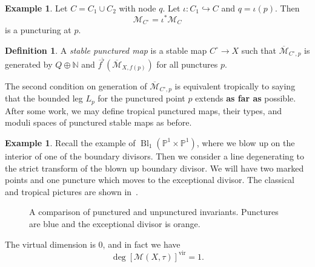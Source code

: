 \documentclass[leqno, openany]{memoir}
\theoremstyle{definition}
\newtheorem{defn}[thm]{Definition}
\newtheorem{exm}[thm]{Example}
\theoremstyle{remark}
\theoremstyle{plain}
\theoremstyle{definition}
\theoremstyle{remark}
\newcommand{\N}{\mathbb{N}}
\renewcommand{\P}{\mathbb{P}}
\newcommand{\mc}[1]{\mathcal{#1}}
\newcommand{\mr}[1]{\mathrm{#1}}
\newcommand{\ol}[1]{\overline{#1}}
\DeclareMathOperator{\Bl}{Bl}
\begin{document}
\begin{exm}
  Let $C = C_1 \cup C_2$ with node $q$. Let $\iota \colon C_1 \hookrightarrow C$ and $q = \iota(p)$. Then
  \[ \mc{M}_{C^{\circ}} = \iota^* \mc{M}_C \]
  is a puncturing at $p$.
\end{exm}

\begin{defn}
A \textit{stable punctured map} is a stable map $C^{\circ} \to X$ such that $\ol{\mc{M}}_{C^{\circ}, p}$ is generated by $Q \oplus \N$ and $\ol{f}^{\flat}(\ol{\mc{M}}_{X,f(p)})$ for all punctures $p$.
\end{defn}

The second condition on generation of $\ol{\mc{M}}_{C^{\circ},p}$ is equivalent tropically to saying that the bounded leg $L_p$ for the punctured point $p$ extends \textbf{as far as} possible. After some work, we may define tropical punctured maps, their types, and moduli spaces of punctured stable maps as before.

\begin{exm}
  Recall the example of $\Bl_1(\P^1 \times \P^1)$, where we blow up on the interior of one of the boundary divisors. Then we consider a line degenerating to the strict transform of the blown up boundary divisor. We will have two marked points and one puncture which moves to the exceptional divisor. The classical and tropical pictures are shown in~.
  \begin{figure}[hptb]
    \centering
    \caption{A comparison of punctured and unpunctured invariants. Punctures are blue and the exceptional divisor is orange.}
    \label{fig:punctured}
  \end{figure}

  The virtual dimension is $0$, and in fact we have
  \[ \deg [\mc{M}(X, \tau)]^{\mr{vir}} = 1. \]
\end{exm}
\end{document}
